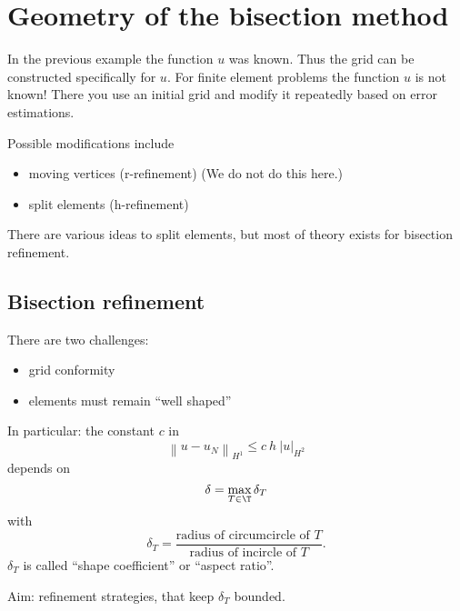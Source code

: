 
\chapter{Geometry of the bisection method}
In the previous example the function $u$ was known. Thus the grid can be constructed specifically for $u$. For finite element problems the function $u $ is not known! There you use an initial grid and modify it repeatedly based on error estimations.

Possible modifications include
\begin{itemize}
  \item moving vertices (r-refinement) (We do not do this here.)
	\item split elements (h-refinement)
\end{itemize}
There are various ideas to split elements, but most of theory exists for bisection refinement.
\section{Bisection refinement}

There are two challenges:
\begin{itemize}
	\item grid conformity
	
\item elements must remain \enquote{well shaped}
	
\end{itemize}
In particular: the constant $c$ in
\begin{equation*}
  \left\|u - u_{N}\right\|_{H^{1}} \leq c\ h\ |u|_{H^{2}}
\end{equation*}
depends on
\begin{equation*}
  \delta = \max_{T \in \T} \delta_{T}
\end{equation*}
with
\begin{equation*}
	\delta_{T}= \frac{\text{radius of circumcircle of }T}{\text{radius of incircle of }T}.
\end{equation*}
$\delta_{T}$ is called \enquote{shape coefficient} or \enquote{aspect ratio}.

Aim: refinement strategies, that keep $\delta_{T}$ bounded.
